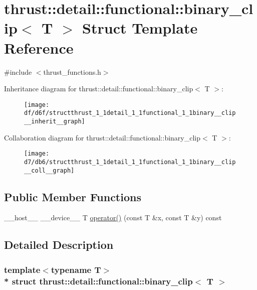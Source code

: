 \hypertarget{structthrust_1_1detail_1_1functional_1_1binary__clip}{}\section{thrust\+:\+:detail\+:\+:functional\+:\+:binary\+\_\+clip$<$ T $>$ Struct Template Reference}
\label{structthrust_1_1detail_1_1functional_1_1binary__clip}


{\ttfamily \#include $<$thrust\+\_\+functions.\+h$>$}



Inheritance diagram for thrust\+:\+:detail\+:\+:functional\+:\+:binary\+\_\+clip$<$ T $>$\+:
\nopagebreak
\begin{figure}[H]
\begin{center}
\leavevmode
\texttt{[image: df/d6f/structthrust\_1\_1detail\_1\_1functional\_1\_1binary\_\_clip\_\_inherit\_\_graph]}
\end{center}
\end{figure}


Collaboration diagram for thrust\+:\+:detail\+:\+:functional\+:\+:binary\+\_\+clip$<$ T $>$\+:
\nopagebreak
\begin{figure}[H]
\begin{center}
\leavevmode
\texttt{[image: d7/db6/structthrust\_1\_1detail\_1\_1functional\_1\_1binary\_\_clip\_\_coll\_\_graph]}
\end{center}
\end{figure}
\subsection*{Public Member Functions}
\begin{DoxyCompactItemize}
\item 
\+\_\+\+\_\+host\+\_\+\+\_\+ \+\_\+\+\_\+device\+\_\+\+\_\+ T \hyperlink{structthrust_1_1detail_1_1functional_1_1binary__clip_ae58e1871aabef8c3a629806af9992cd1}{operator()} (const T \&x, const T \&y) const 
\end{DoxyCompactItemize}


\subsection{Detailed Description}
\subsubsection*{template$<$typename T$>$\\*
struct thrust\+::detail\+::functional\+::binary\+\_\+clip$<$ T $>$}



